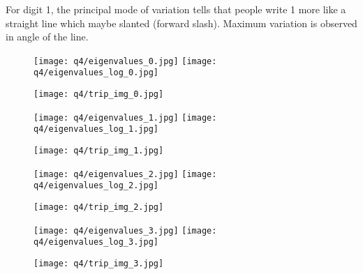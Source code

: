 \documentclass[11pt, fleqn]{article}
\begin{document}
For digit 1, the principal mode of variation tells that people write 1 more like a straight line which maybe slanted (forward slash). Maximum variation is observed in angle of the line. 

\newpage
\begin{figure}[H]
    \begin{floatrow}
        \ffigbox[0.45\textwidth]{}
        {\texttt{[image: q4/eigenvalues\_0.jpg]}}
        \ffigbox[0.45\textwidth]{}
        {\texttt{[image: q4/eigenvalues\_log\_0.jpg]}}
    \end{floatrow}
    \vspace{1em}
    \begin{floatrow}
        \ffigbox[0.9\textwidth]{}
        {\texttt{[image: q4/trip\_img\_0.jpg]}}
    \end{floatrow}
\end{figure}
\newpage
\begin{figure}[H]
    \begin{floatrow}
        \ffigbox[0.45\textwidth]{}
        {\texttt{[image: q4/eigenvalues\_1.jpg]}}
        \ffigbox[0.45\textwidth]{}
        {\texttt{[image: q4/eigenvalues\_log\_1.jpg]}}
    \end{floatrow}
    \vspace{1em}
    \begin{floatrow}
        \ffigbox[0.9\textwidth]{}
        {\texttt{[image: q4/trip\_img\_1.jpg]}}
    \end{floatrow}
\end{figure}
\newpage
\begin{figure}[H]
    \begin{floatrow}
        \ffigbox[0.45\textwidth]{}
        {\texttt{[image: q4/eigenvalues\_2.jpg]}}
        \ffigbox[0.45\textwidth]{}
        {\texttt{[image: q4/eigenvalues\_log\_2.jpg]}}
    \end{floatrow}
    \vspace{1em}
    \begin{floatrow}
        \ffigbox[0.9\textwidth]{}
        {\texttt{[image: q4/trip\_img\_2.jpg]}}
    \end{floatrow}
\end{figure}
\newpage
\begin{figure}[H]
    \begin{floatrow}
        \ffigbox[0.45\textwidth]{}
        {\texttt{[image: q4/eigenvalues\_3.jpg]}}
        \ffigbox[0.45\textwidth]{}
        {\texttt{[image: q4/eigenvalues\_log\_3.jpg]}}
    \end{floatrow}
    \vspace{1em}
    \begin{floatrow}
        \ffigbox[0.9\textwidth]{}
        {\texttt{[image: q4/trip\_img\_3.jpg]}}
    \end{floatrow}
\end{figure}
\end{document}

